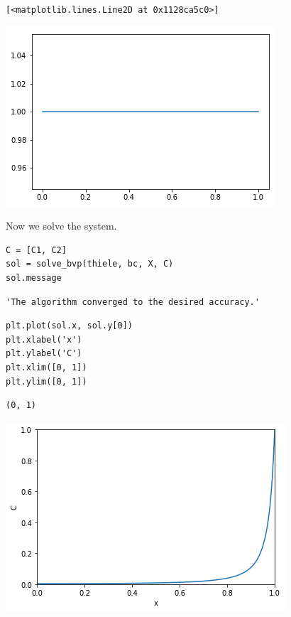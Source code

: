 \documentclass[11pt]{article}
\begin{document}
\begin{verbatim}
[<matplotlib.lines.Line2D at 0x1128ca5c0>]
\end{verbatim}



\begin{center}
\includegraphics[width=.9\linewidth]{obipy-resources/9f7f3151fe203e2a10edce4b06f0b33f-90490qaK.png}
\end{center}


Now we solve the system.

\begin{verbatim}
C = [C1, C2]
sol = solve_bvp(thiele, bc, X, C)
sol.message
\end{verbatim}

\begin{verbatim}
'The algorithm converged to the desired accuracy.'
\end{verbatim}

\begin{verbatim}
plt.plot(sol.x, sol.y[0])
plt.xlabel('x')
plt.ylabel('C')
plt.xlim([0, 1])
plt.ylim([0, 1])
\end{verbatim}

\begin{verbatim}
(0, 1)
\end{verbatim}



\begin{center}
\includegraphics[width=.9\linewidth]{obipy-resources/9f7f3151fe203e2a10edce4b06f0b33f-904903kQ.png}
\end{center}
\end{document}
